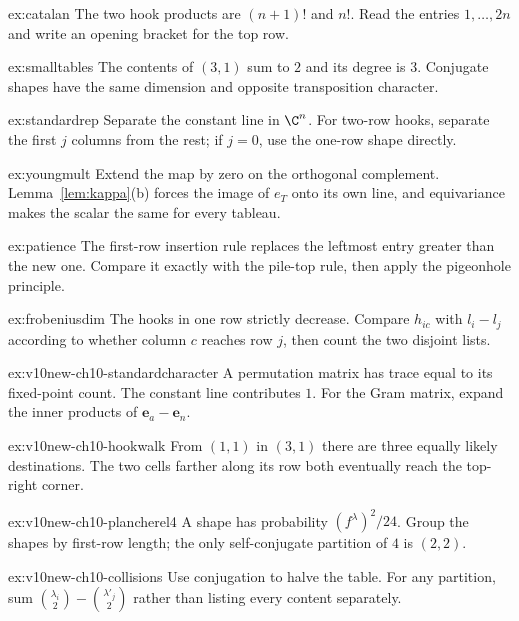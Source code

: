 \begin{hint}{ex:catalan}
The two hook products are $(n+1)!$ and $n!$. Read the entries $1,\ldots,2n$ and write an opening bracket for the top row.
\end{hint}
\begin{hint}{ex:smalltables}
The contents of $(3,1)$ sum to $2$ and its degree is $3$. Conjugate shapes have the same dimension and opposite transposition character.
\end{hint}
\begin{hint}{ex:standardrep}
Separate the constant line in $\C^n$. For two-row hooks, separate the first $j$ columns from the rest; if $j=0$, use the one-row shape directly.
\end{hint}
\begin{hint}{ex:youngmult}
Extend the map by zero on the orthogonal complement. Lemma~\ref{lem:kappa}(b) forces the image of $e_T$ onto its own line, and equivariance makes the scalar the same for every tableau.
\end{hint}
\begin{hint}{ex:patience}
The first-row insertion rule replaces the leftmost entry greater than the new one. Compare it exactly with the pile-top rule, then apply the pigeonhole principle.
\end{hint}
\begin{hint}{ex:frobeniusdim}
The hooks in one row strictly decrease. Compare $h_{ic}$ with $l_i-l_j$ according to whether column $c$ reaches row $j$, then count the two disjoint lists.
\end{hint}
\begin{hint}{ex:v10new-ch10-standardcharacter}
A permutation matrix has trace equal to its fixed-point count. The constant line contributes $1$. For the Gram matrix, expand the inner products of $\mathbf e_a-\mathbf e_n$.
\end{hint}
\begin{hint}{ex:v10new-ch10-hookwalk}
From $(1,1)$ in $(3,1)$ there are three equally likely destinations. The two cells farther along its row both eventually reach the top-right corner.
\end{hint}
\begin{hint}{ex:v10new-ch10-plancherel4}
A shape has probability $(f^\lambda)^2/24$. Group the shapes by first-row length; the only self-conjugate partition of $4$ is $(2,2)$.
\end{hint}
\begin{hint}{ex:v10new-ch10-collisions}
Use conjugation to halve the table. For any partition, sum $\binom{\lambda_i}2-\binom{\lambda'_j}2$ rather than listing every content separately.
\end{hint}

